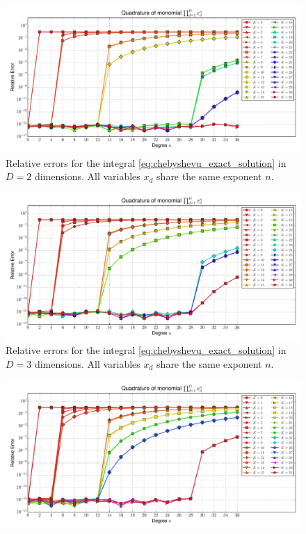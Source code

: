 \documentclass[a4paper,10pt]{article}
\begin{document}
\begin{subfigures}
  \begin{figure}\centering
    \includegraphics[width=\linewidth]{./img/monomial_errors_chebyshevu_multivariate_dimension_2.pdf}
    \caption{Relative errors for the integral \eqref{eq:chebyshevu_exact_solution}
    in $D=2$ dimensions. All variables $x_d$ share the same exponent $n$.}
    \label{fig:monomial_errors_chebyshevu_multivariate_dimension_2}
  \end{figure}
  \begin{figure}\centering
    \includegraphics[width=\linewidth]{./img/monomial_errors_chebyshevu_multivariate_dimension_3.pdf}
    \caption{Relative errors for the integral \eqref{eq:chebyshevu_exact_solution}
    in $D=3$ dimensions. All variables $x_d$ share the same exponent $n$.}
    \label{fig:monomial_errors_chebyshevu_multivariate_dimension_3}
  \end{figure}
  \begin{figure}\centering
    \includegraphics[width=\linewidth]{./img/monomial_errors_chebyshevu_multivariate_dimension_4.pdf}

\end{figure}
\end{subfigures}
\end{document}
